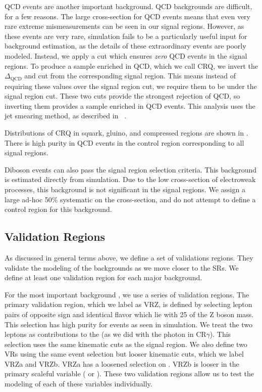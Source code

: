 QCD events are another important background.
QCD backgrounds are difficult, for a few reasons.
The large cross-section for QCD events means that even very rare extreme mismeasurements can be seen in our signal regions.
However, as these events are very rare, simulation fails to be a particularly useful input for background estimation, as the details of these extraordinary events are poorly modeled.
Instead, we apply a cut which ensures \textit{zero} QCD events in the signal regions.
To produce a sample enriched in QCD, which we call CRQ, we invert the $\Delta_{\mathrm{QCD}}$ and  cut from the corresponding signal region.
This means instead of requiring these values over the signal region cut, we require them to be under the signal region cut.
These two cuts provide the strongest rejection of QCD, so inverting them provides a sample enriched in QCD events.
This analysis uses the jet smearing method, as described in ~\cite{SUSY-2011-20}.

Distributions of CRQ in squark, gluino, and compressed regions are shown in .
There is high purity in QCD events in the control region corresponding to all signal regions.

Diboson events can also pass the signal region selection criteria.
This background is estimated directly from simulation.
Due to the low cross-section of electroweak processes, this background is not significant in the signal regions.
We assign a large ad-hoc 50\% systematic on the cross-section, and do not attempt to define a control region for this background.



\subsection{Validation Regions}

As discussed in general terms above, we define a set of validations regions.
They validate the modeling of the backgrounds as we move closer to the SRs.
We define at least one validation region for each major background.

For the most important background \Zvv, we use a series of validation regions.
The primary validation region, which we label as VRZ, is defined by selecting lepton pairs of opposite sign and identical flavor which lie with 25 \GeV of the Z boson mass.
This selection has high purity for \Zll events as seen in simulation.
We treat the two leptons as contributions to the \met (as we did with the photon in CR$\gamma$).
This selection uses the same kinematic cuts as the signal region.
We also define two VRs using the same event selection but looser kinematic cuts, which we label VRZa and VRZb.
VRZa has a loosened selection on .
VRZb is looser in the primary scaleful variable  ( or ).
These two validation regions allow us to test the modeling of each of these variables individually.

